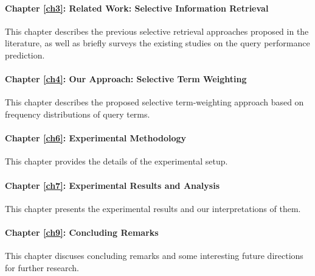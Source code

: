 \paragraph{Chapter \ref{ch3}: Related Work: Selective Information Retrieval}
This chapter describes the previous selective retrieval approaches proposed in the literature, as well as briefly surveys the existing studies on the query performance prediction.

\paragraph{Chapter \ref{ch4}: Our Approach: Selective Term Weighting}
This chapter describes the proposed selective term-weighting approach based on frequency distributions of query terms.

\paragraph{Chapter \ref{ch6}: Experimental Methodology}
This chapter provides the details of the experimental setup.

\paragraph{Chapter \ref{ch7}: Experimental Results and Analysis}
This chapter presents the experimental results and our interpretations of them.

\paragraph{Chapter \ref{ch9}: Concluding Remarks}
This chapter discuses concluding remarks and some interesting future directions for further research.



 